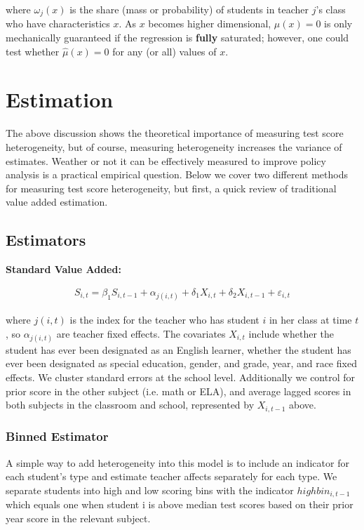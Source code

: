 \documentclass{article}
\theoremstyle{definition}
\theoremstyle{definition}
\theoremstyle{definition}
\theoremstyle{definition}
\begin{document}
    \noindent where $\omega_j(x)$ is the share (mass or probability) of students in teacher $j$'s class who have characteristics $x$. As $x$ becomes higher dimensional, $\mu(x)=0$ is only mechanically guaranteed if the regression is \textbf{fully} saturated; however, one could test whether $\hat{\mu}(x)=0$ for any (or all) values of $x$.



\section{Estimation}

    The above discussion shows the theoretical importance of measuring test score heterogeneity, but of course, measuring heterogeneity increases the variance of estimates. Weather or not it can be effectively measured to improve policy analysis is a practical empirical question. Below we cover two different methods for measuring test score heterogeneity, but first, a quick review of traditional value added estimation. 


    \subsection{Estimators}
    \noindent \textbf{Standard Value Added:}
    
    \begin{align*}
        S_{i,t} = \beta_1 S_{i,t-1} + \alpha_{j(i, t)} + \delta_1 X_{i, t} + \delta_2 X_{i, t-1} + \varepsilon_{i, t}
    \end{align*}
    
    \noindent where $j(i, t)$ is the index for the teacher who has student $i$ in her class at time $t$, so $\alpha_{j(i, t)}$ are teacher fixed effects. The covariates $X_{i, t}$ include whether the student has ever been designated as an English learner, whether the student has ever been designated as special education, gender, and grade, year, and race fixed effects. We cluster standard errors at the school level. Additionally we control for prior score in the other subject (i.e. math or ELA), and average lagged scores in both subjects in the classroom and school, represented by $X_{i, t-1}$ above.

        \subsubsection{Binned Estimator}
        A simple way to add heterogeneity into this model is to include an indicator for each student's type and estimate teacher affects separately for each type. We separate students into high and low scoring bins with the indicator $highbin_{i,t-1}$ which equals one when student i is above median test scores based on their prior year score in the relevant subject.
        
\end{document}
